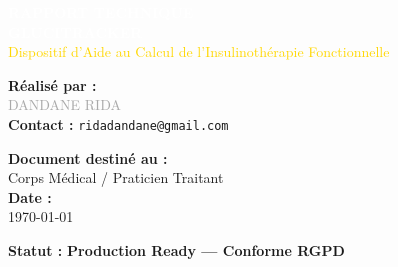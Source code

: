 \documentclass[11pt, a4paper]{report}
\begin{document}
\begin{titlepage}
    \centering
    \vspace*{1.5cm}

    \begin{tcolorbox}[
        enhanced,
        colback=medblue,
        colframe=gold,
        arc=15pt,
        width=0.9\textwidth,
        boxrule=2pt,
        center upper,
        top=20pt, bottom=20pt
    ]
        {\Huge \textcolor{white}{\textbf{RAPPORT TECHNIQUE}}} \\[10pt]
        {\huge \textcolor{white}{\textbf{GLUCITRACKER}}} \\[12pt]
        {\large \textcolor{gold}{Dispositif d'Aide au Calcul de l'Insulinothérapie Fonctionnelle}}
    \end{tcolorbox}

    \vspace{2.5cm}

    \begin{tcolorbox}[
        colback=white,
        colframe=medblue,
        arc=10pt,
        width=0.75\textwidth,
        boxrule=1.2pt,
        center upper,
        top=15pt, bottom=15pt
    ]
        {\Large \textbf{Réalisé par :}} \\[8pt]
        {\LARGE \textcolor{darkgray}{DANDANE RIDA}} \\[10pt]
        
        \textbf{Contact :} \texttt{ridadandane@gmail.com}
    \end{tcolorbox}

    \vspace{2cm}

    \begin{tcolorbox}[
        colback=white,
        colframe=medblue,
        arc=10pt,
        width=0.6\textwidth,
        boxrule=1.2pt,
        center upper,
        top=15pt, bottom=15pt
    ]
        {\Large \textbf{Document destiné au :}} \\[6pt]
        {\large Corps Médical / Praticien Traitant} \\[15pt]
        {\Large \textbf{Date :}} \\[6pt]
        {\large \today}
    \end{tcolorbox}

    \vfill
    \textcolor{medblue}{\textbf{Statut :}} \textbf{Production Ready — Conforme RGPD}
\end{titlepage}
\end{document}
